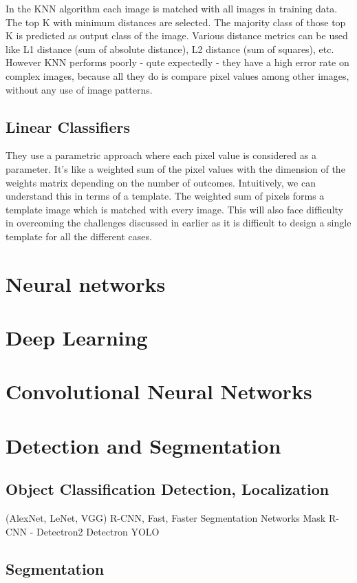 In the KNN algorithm each image is matched with all images in training data. The
top K with minimum distances are selected. The majority class of those top K is
predicted as output class of the image. Various distance metrics can be used
like L1 distance (sum of absolute distance), L2 distance (sum of squares), etc.
However KNN performs poorly - qute expectedly - they have a high error rate on
complex images, because all they do is compare pixel values among other images,
without any use of image patterns.

\subsection{Linear Classifiers}

They use a parametric approach where each pixel value is considered as a
parameter. It’s like a weighted sum of the pixel values with the dimension of
the weights matrix depending on the number of outcomes. Intuitively, we can
understand this in terms of a template. The weighted sum of pixels forms a
template image which is matched with every image. This will also face difficulty
in overcoming the challenges discussed in earlier as it is difficult to design a
single template for all the different cases.

\section{Neural networks}



\section{Deep Learning}
\section{Convolutional Neural Networks}
\section{Detection and Segmentation}
\subsection{Object Classification Detection, Localization }
    (AlexNet, LeNet, VGG)
    R-CNN, Fast, Faster
    Segmentation Networks
    Mask R-CNN - Detectron2
    Detectron
    YOLO
\subsection{Segmentation}
